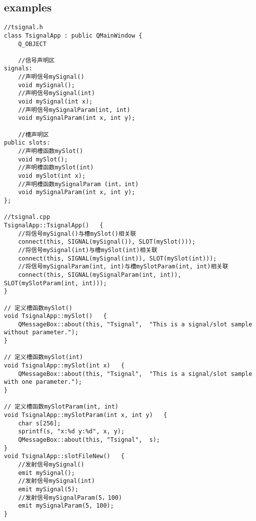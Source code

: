 \documentclass[9pt,b5paper]{article}
\begin{document}
\subsection{examples}
\label{sec-1-6}
\lstset{language=java,label= ,caption= ,numbers=none}
\begin{lstlisting}
//tsignal.h  
class TsignalApp : public QMainWindow {  
    Q_OBJECT  

    //信号声明区  
signals:  
    //声明信号mySignal()  
    void mySignal();  
    //声明信号mySignal(int)  
    void mySignal(int x);  
    //声明信号mySignalParam(int, int)  
    void mySignalParam(int x, int y);  

    //槽声明区  
public slots:  
    //声明槽函数mySlot()  
    void mySlot();  
    //声明槽函数mySlot(int)  
    void mySlot(int x);  
    //声明槽函数mySignalParam (int，int)  
    void mySignalParam(int x, int y);  
};

//tsignal.cpp  
TsignalApp::TsignalApp()   {  
    //将信号mySignal()与槽mySlot()相关联  
    connect(this, SIGNAL(mySignal()), SLOT(mySlot()));  
    //将信号mySignal(int)与槽mySlot(int)相关联  
    connect(this, SIGNAL(mySignal(int)), SLOT(mySlot(int)));  
    //将信号mySignalParam(int, int)与槽mySlotParam(int, int)相关联  
    connect(this, SIGNAL(mySignalParam(int, int)), SLOT(mySlotParam(int, int)));  
}  

// 定义槽函数mySlot()  
void TsignalApp::mySlot()   {  
    QMessageBox::about(this, "Tsignal",  "This is a signal/slot sample without parameter.");  
}  

// 定义槽函数mySlot(int)  
void TsignalApp::mySlot(int x)   {  
    QMessageBox::about(this, "Tsignal",  "This is a signal/slot sample with one parameter.");  
}  

// 定义槽函数mySlotParam(int, int)  
void TsignalApp::mySlotParam(int x, int y)   {  
    char s[256];  
    sprintf(s, "x:%d y:%d", x, y);  
    QMessageBox::about(this, "Tsignal",  s);  
}  
void TsignalApp::slotFileNew()   {  
    //发射信号mySignal()  
    emit mySignal();  
    //发射信号mySignal(int)  
    emit mySignal(5);  
    //发射信号mySignalParam(5，100)  
    emit mySignalParam(5, 100);  
}
\end{lstlisting}
\end{document}

